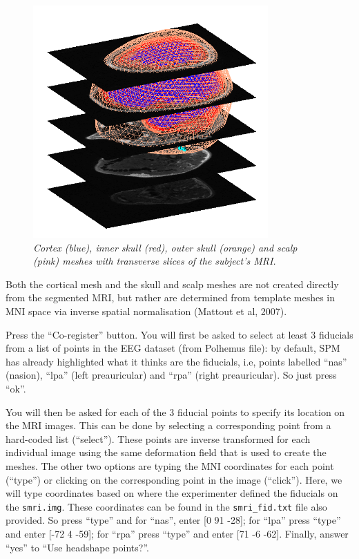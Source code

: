 \begin{figure}
\begin{center}
\includegraphics[width=90mm]{multimodal/figures/eeg_meshing}
\caption{\em Cortex (blue), inner skull (red), outer skull (orange) and scalp (pink) meshes with transverse slices of the subject's MRI. \label{multimodal:fig:3}}
\end{center}
\end{figure}

Both the cortical mesh and the skull and scalp meshes are not created directly from the segmented MRI, but rather are determined from template meshes in MNI space via inverse spatial normalisation (Mattout et al, 2007).

Press the ``Co-register'' button. You will first be asked to select at least 3 fiducials from a list of points in the EEG dataset (from Polhemus file): by default, SPM has already highlighted what it thinks are the fiducials, i.e, points labelled ``nas'' (nasion), ``lpa'' (left preauricular) and ``rpa'' (right preauricular). So just press ``ok''.

You will then be asked for each of the 3 fiducial points to specify its location on the MRI images. This can be done by selecting a corresponding point from a hard-coded list (``select''). These points are inverse transformed for each individual image using the same deformation field that is used to create the meshes. The other two options are typing the MNI coordinates for each point (``type'') or clicking on the corresponding point in the image (``click''). Here, we will type coordinates based on where the experimenter defined the fiducials on the \texttt{smri.img}. These coordinates can be found in the \texttt{smri\_fid.txt} file also provided. So press ``type'' and for ``nas'', enter [0 91 -28]; for ``lpa'' press ``type'' and enter [-72 4 -59]; for ``rpa'' press ``type'' and enter [71 -6 -62]. Finally, answer ``yes'' to ``Use headshape points?''.

